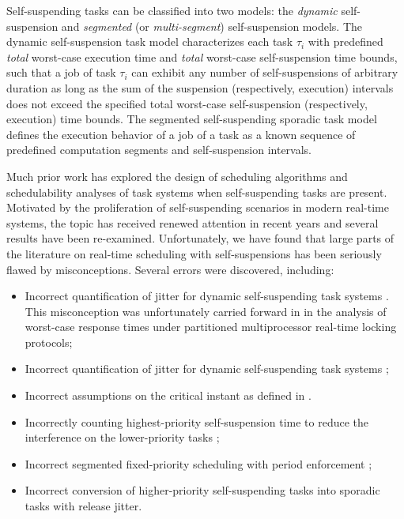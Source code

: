 Self-suspending tasks can be classified into two models: the \emph{dynamic} self-suspension and \emph{segmented} (or \emph{multi-segment}) self-suspension models.
The dynamic self-suspension %
task model characterizes each
task $\tau_i$ with predefined \emph{total} worst-case execution time and \emph{total} worst-case self-suspension time bounds, such that a job of task $\tau_i$ can exhibit any number of self-suspensions of arbitrary duration as long as the sum of the suspension (respectively, execution) intervals does not exceed the specified total worst-case self-suspension (respectively, execution) time bounds. The segmented self-suspending sporadic task model defines the execution behavior of a job of a task as a known sequence of predefined computation segments and self-suspension intervals.  

Much prior work has explored the design of scheduling algorithms and schedulability analyses of task systems when self-suspending tasks are present. Motivated by the proliferation of self-suspending scenarios in modern real-time systems, the topic has received renewed attention in recent years and several results have been re-examined. Unfortunately, we have found that large parts of the literature on real-time scheduling with self-suspensions has been seriously flawed by misconceptions. Several errors were discovered, including: 
\begin{itemize}
\item Incorrect quantification of jitter for dynamic self-suspending
  task systems
  \cite{ECRTS-AudsleyB04,RTAS-AudsleyB04,RTCSA-KimCPKH95,MingLiRTCSA1994}.  This
  misconception was unfortunately carried forward in \cite{zeng-2011,bbb-2013,yang-2013,kim-2014,han-2014,carminati-2014,yang-2014,lakshmanan-2009} in the analysis of worst-case response times under
  partitioned multiprocessor real-time locking protocols;
\item Incorrect quantification of jitter for dynamic self-suspending
  task systems \cite{RTCSA-BletsasA05};
\item Incorrect assumptions on the critical instant as defined in \cite{LR:rtas10}.
\item Incorrectly counting highest-priority self-suspension time to reduce the
  interference on the lower-priority tasks  \cite{RTSS-KimANR13}; 
\item Incorrect segmented fixed-priority scheduling with period
  enforcement \cite{RTSS-KimANR13,DBLP:journals/ieicet/DingTT09};
\item Incorrect conversion of higher-priority self-suspending tasks into sporadic tasks with release jitter\cite{ecrts15nelissen}.
\end{itemize}


